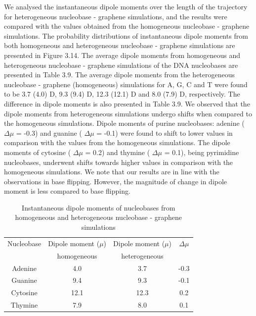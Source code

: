     We analysed the instantaneous dipole moments over the length of the trajectory for heterogeneous nucleobase - graphene simulations, and the results were compared with the values obtained from the homogeneous nucleobase - graphene simulations. The probability distributions of instantaneous dipole moments from both homogeneous and heterogeneous nucleobase - graphene simulations are presented in Figure 3.14. The average dipole moments from homogeneous and heterogeneous nucleobase - graphene simulations of the DNA nucleobases are presented in Table 3.9. The average dipole moments from the heterogeneous nucleobase - graphene (homogeneous) simulations for A, G, C and T were found to be 3.7 (4.0) D, 9.3 (9.4) D, 12.3 (12.1) D and 8.0 (7.9) D, respectively. The difference in dipole moments is also presented in Table 3.9. We observed that the dipole moments from heterogeneous simulations undergo shifts when compared to the homogeneous simulations. Dipole moments of purine nucleobases: adenine ($\Delta\mu$ = -0.3) and guanine ( $\Delta\mu$ = -0.1) were found to shift to lower values in comparison with the values from the homogeneous simulations. The dipole moments of cytosine ( $\Delta\mu$ = 0.2) and thymine ( $\Delta\mu$ = 0.1), being pyrimidine nucleobases, underwent shifts towards higher values in comparison with the homogeneous simulations. We note that our results are in line with the observations in base flipping.\supercite{lemkul_induced_2014} However, the magnitude of change in dipole moment is less compared to base flipping.
    \begin{table}
        \centering
        \caption[Instantaneous dipole moments of nucleobases from homogeneous and heterogeneous nucleobase - graphene simulations]{Instantaneous dipole moments of nucleobases from homogeneous and heterogeneous nucleobase - graphene simulations}
        \begin{tabular}{cccc}
            \toprule
            Nucleobase  &   Dipole moment ($\mu$)   &   Dipole moment ($\mu$)   & $\Delta\mu$\\
                        &   homogeneous             &   heterogeneous           &           \\  \midrule
            Adenine     &   4.0                     &   3.7                     &   -0.3    \\
            Guanine     &   9.4                     &   9.3                     &   -0.1    \\
            Cytosine    &   12.1                    &   12.3                    &   0.2     \\
            Thymine     &   7.9                     &   8.0                     &   0.1     \\  \bottomrule
        \end{tabular}
    \end{table}
    
